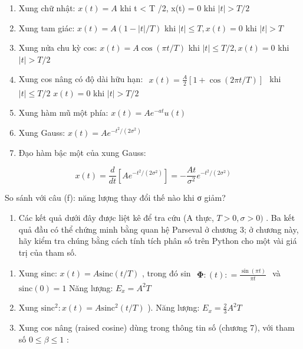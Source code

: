 \documentclass[
  10
]{article}
\providecommand{\tightlist}{%
  \setlength{\itemsep}{0pt}\setlength{\parskip}{0pt}}
\begin{document}
\begin{enumerate}
\def\labelenumi{(\alph{enumi})}
\item
  Xung chữ nhật: \(x ( t ) = A\) khi t \textless{} T /2, x(t) = 0 khi
  \(\vert t \vert > T / 2\)
\item
  Xung tam giác: \(x ( t ) = A ( 1 - | t | / T )\) khi
  \(| t | \leq T , x ( t ) = 0\) khi \(| t | > T\)
\item
  Xung nửa chu kỳ cos: \(x ( t ) = A \cos ( \pi t / T )\) khi
  \(| t | \le T / 2 , x ( t ) = 0\) khi \(\vert t \vert > T / 2\)
\item
  Xung cos nâng có độ dài hữu hạn:
  \(\begin{array} { r } { x ( t ) = \frac { A } { 2 } \left[ 1 + \cos ( 2 \pi t / T ) \right] } \end{array}\)
  khi \(\vert t \vert \le T / 2\) \(x ( t ) = 0\) khi
  \(\vert t \vert > T / 2\)
\item
  Xung hàm mũ một phía: \(x ( t ) = A e ^ { - a t } u ( t )\)
\item
  Xung Gauss: \(x ( t ) = A e ^ { - t ^ { 2 } / ( 2 \sigma ^ { 2 } ) }\)
\item
  Đạo hàm bậc một của xung Gauss:
\end{enumerate}

\[
x (t) = \frac {d}{d t} \left[ A e ^ {- t ^ {2} / (2 \sigma^ {2})} \right] = - \frac {A t}{\sigma^ {2}} e ^ {- t ^ {2} / (2 \sigma^ {2})}
\]

So sánh với câu (f): năng lượng thay đổi thế nào khi σ giảm?

\begin{enumerate}
\def\labelenumi{\arabic{enumi}.}
\setcounter{enumi}{12}
\tightlist
\item
  Các kết quả dưới đây được liệt kê để tra cứu (A thực,
  \(T > 0 , \sigma > 0 )\) . Ba kết quả đầu có thể chứng minh bằng quan
  hệ Parseval ở chương 3; ở chương này, hãy kiểm tra chúng bằng cách
  tính tích phân số trên Python cho một vài giá trị của tham số.
\end{enumerate}

\begin{enumerate}
\def\labelenumi{(\alph{enumi})}
\item
  Xung sinc: \(x ( t ) = A \mathrm { s i n c } ( t / T )\) , trong đó
  sin
  \(\begin{array} { r } { \mathbf { \Phi } : ( t ) : = \frac { \sin ( \pi t ) } { \pi t } } \end{array}\)
  và \(\mathrm { s i n c } ( 0 ) = 1\) Năng lượng:
  \(E _ { x } = A ^ { 2 } T\)
\item
  Xung
  \(\mathrm { s i n c } ^ { 2 } \colon x ( t ) = A \mathrm { s i n c } ^ { 2 } ( t / T )\)
  ). Năng lượng:
  \(\textstyle E _ { x } = { \frac { 2 } { 3 } } A ^ { 2 } T\)
\item
  Xung cos nâng (raised cosine) dùng trong thông tin số (chương 7), với
  tham số \(0 \leq \beta \leq 1\) :
\end{enumerate}
\end{document}
